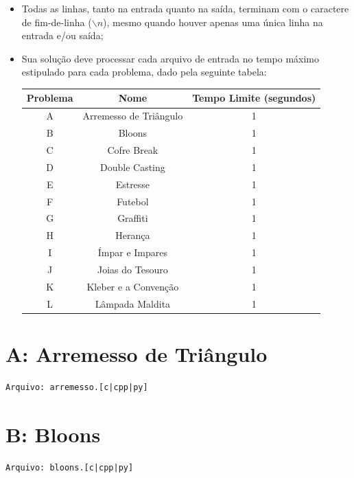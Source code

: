 \documentclass[12pt,oneside]{article} %
\begin{document}
\begin{itemize}
    \item Todas as linhas, tanto na entrada quanto na saída, terminam com o
    caractere de fim-de-linha ($\backslash n$), mesmo quando houver apenas uma única
    linha na entrada e/ou saída;

    \newpage
    \item Sua solução deve processar cada arquivo de entrada no tempo máximo
    estipulado para cada problema, dado pela seguinte tabela:

    \begin{table}[h]
    \centering
    \begin{tabular}{|c|c||c|}
    \hline
    \textbf{Problema} & \textbf{Nome} & \textbf{Tempo Limite (segundos)} \\
    \hline
    A & Arremesso de Triângulo & 1 \\
    B & Bloons & 1 \\
    C & Cofre Break & 1 \\
    D & Double Casting & 1 \\
    E & Estresse & 1 \\ %
    F & Futebol & 1 \\
    G & Graffiti & 1 \\
    H & Herança & 1 \\ %
    I & Ímpar e Impares & 1 \\
    J & Joias do Tesouro & 1 \\
    K & Kleber e a Convenção & 1 \\
    L & Lâmpada Maldita & 1 \\
    \hline
    \end{tabular}
    \end{table}

\end{itemize}

\newpage
\section*{A: Arremesso de Triângulo} %
\vspace{-0.52cm}
\noindent \begin{verbatim}Arquivo: arremesso.[c|cpp|py]\end{verbatim}


\newpage
\section*{B: Bloons} %
\vspace{-0.52cm}
\noindent \begin{verbatim}Arquivo: bloons.[c|cpp|py]\end{verbatim}

\end{document}
